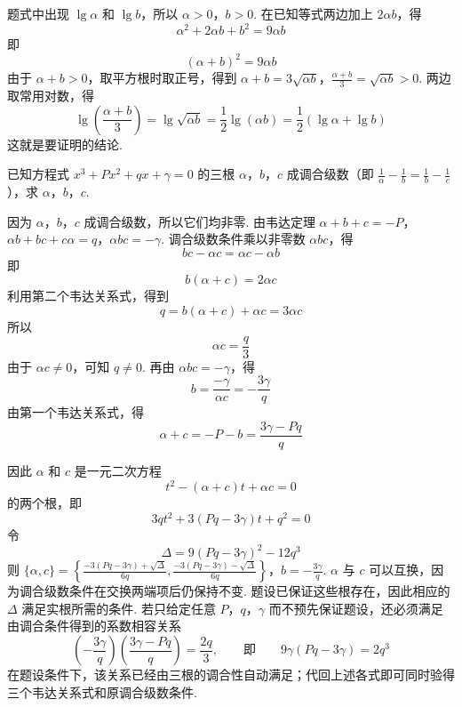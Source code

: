 \begin{solution}
题式中出现 \(\lg\alpha\) 和 \(\lg b\)，所以 \(\alpha>0\)，\(b>0\). 在已知等式两边加上 \(2\alpha b\)，得
\[
\alpha^2+2\alpha b+b^2=9\alpha b
\]
即
\[
(\alpha+b)^2=9\alpha b
\]
由于 \(\alpha+b>0\)，取平方根时取正号，得到
\(\alpha+b=3\sqrt{\alpha b}\)，\(\frac{\alpha+b}{3}=\sqrt{\alpha b}>0\).
两边取常用对数，得
\[
\lg\left(\frac{\alpha+b}{3}\right)=\lg\sqrt{\alpha b}
 =\frac12\lg(\alpha b)
 =\frac12\left(\lg\alpha+\lg b\right)
\]
这就是要证明的结论.
\end{solution}

\begin{problem}
已知方程式 \(x^{3}+Px^{2}+qx+\gamma=0\) 的三根 \(\alpha\)，\(b\)，\(c\) 成调合级数（即 \(\frac{1}{\alpha}-\frac{1}{b}=\frac{1}{b}-\frac{1}{c}\)），求 \(\alpha\)，\(b\)，\(c\).
\end{problem}

\begin{solution}
因为 \(\alpha\)，\(b\)，\(c\) 成调合级数，所以它们均非零. 由韦达定理
\(\alpha+b+c=-P\)，\(\alpha b+bc+c\alpha=q\)，\(\alpha bc=-\gamma\).
调合级数条件乘以非零数 \(\alpha bc\)，得
\[
bc-\alpha c=\alpha c-\alpha b
\]
即
\[
b(\alpha+c)=2\alpha c
\]
利用第二个韦达关系式，得到
\[
q=b(\alpha+c)+\alpha c=3\alpha c
\]
所以
\[
\alpha c=\frac q3
\]
由于 \(\alpha c\ne0\)，可知 \(q\ne0\). 再由 \(\alpha bc=-\gamma\)，得
\[
b=\frac{-\gamma}{\alpha c}=-\frac{3\gamma}{q}
\]
由第一个韦达关系式，得
\[
\alpha+c=-P-b=\frac{3\gamma-Pq}{q}
\]

因此 \(\alpha\) 和 \(c\) 是一元二次方程
\[
t^2-(\alpha+c)t+\alpha c=0
\]
的两个根，即
\[
3qt^2+3(Pq-3\gamma)t+q^2=0
\]
令
\[
\Delta=9(Pq-3\gamma)^2-12q^3
\]
则
\(\{\alpha,c\} =\left\{ \frac{-3(Pq-3\gamma)+\sqrt{\Delta}}{6q}, \frac{-3(Pq-3\gamma)-\sqrt{\Delta}}{6q} \right\}\)，\(b=-\frac{3\gamma}{q}\).
\(\alpha\) 与 \(c\) 可以互换，因为调合级数条件在交换两端项后仍保持不变. 题设已保证这些根存在，因此相应的 \(\Delta\) 满足实根所需的条件. 若只给定任意 \(P\)，\(q\)，\(\gamma\) 而不预先保证题设，还必须满足由调合条件得到的系数相容关系
\[
\left(-\frac{3\gamma}{q}\right)\left(\frac{3\gamma-Pq}{q}\right)=\frac{2q}{3},
\qquad\text{即}\qquad
9\gamma(Pq-3\gamma)=2q^3
\]
在题设条件下，该关系已经由三根的调合性自动满足；代回上述各式即可同时验得三个韦达关系式和原调合级数条件.
\end{solution}
